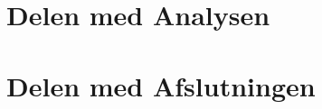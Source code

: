 
\part{Delen med Analysen \label{part_analyse}}

		
				


\part{Delen med Afslutningen \label{part_afslutning}}





\begin{appendix}
\setcounter{secnumdepth}{3}




% 
% 


%
% 



\end{appendix} 

\newpage

